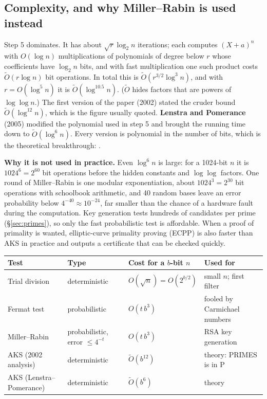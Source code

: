\subsection{Complexity, and why Miller--Rabin is used instead \new}

Step 5 dominates. It has about $\sqrt r \log_2 n$ iterations; each computes $(X + a)^n$ with $O(\log n)$ multiplications of polynomials of degree below $r$ whose coefficients have $\log_2 n$ bits, and with fast multiplication one such product costs $\tilde O(r \log n)$ bit operations. In total this is $\tilde O(r^{3/2} \log^3 n)$, and with $r = O(\log^5 n)$ it is $\tilde O(\log^{10.5} n)$. ($\tilde O$ hides factors that are powers of $\log\log n$.) The first version of the paper (2002) stated the cruder bound $\tilde O(\log^{12} n)$, which is the figure usually quoted. \textbf{Lenstra and Pomerance} (2005) modified the polynomial used in step 5 and brought the running time down to $\tilde O(\log^{6} n)$. Every version is polynomial in the number of bits, which is the theoretical breakthrough: .

\textbf{Why it is not used in practice.} Even $\log^6 n$ is large: for a 1024-bit $n$ it is $1024^6 = 2^{60}$ bit operations before the hidden constants and $\log\log$ factors. One round of Miller--Rabin is one modular exponentiation, about $1024^3 = 2^{30}$ bit operations with schoolbook arithmetic, and 40 random bases leave an error probability below $4^{-40} \approx 10^{-24}$, far smaller than the chance of a hardware fault during the computation. Key generation tests hundreds of candidates per prime (\S\ref{sec:primes}), so only the fast probabilistic test is affordable. When a proof of primality is wanted, elliptic-curve primality proving (ECPP) is also faster than AKS in practice and outputs a certificate that can be checked quickly.

\begin{center}\small
\begin{tabular}{@{}llll@{}}
\toprule
Test & Type & Cost for a $b$-bit $n$ & Used for\\
\midrule
Trial division & deterministic & $O(\sqrt n) = O(2^{b/2})$ & small $n$; first filter\\
Fermat test & probabilistic & $O(t\,b^3)$ & fooled by Carmichael numbers\\
Miller--Rabin & probabilistic, error $\le 4^{-t}$ & $O(t\,b^3)$ & RSA key generation\\
AKS (2002 analysis) & deterministic & $\tilde O(b^{12})$ & theory: PRIMES is in P\\
AKS (Lenstra--Pomerance) & deterministic & $\tilde O(b^{6})$ & theory\\
\bottomrule
\end{tabular}
\end{center}

